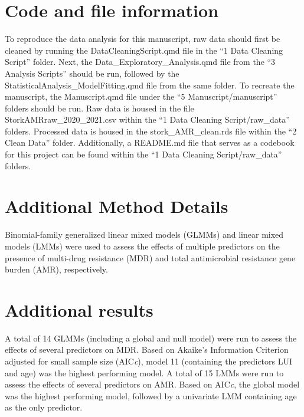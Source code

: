 \documentclass[
  letterpaper,
  DIV=11,
  numbers=noendperiod]{scrartcl}
\begin{document}
\hypertarget{code-and-file-information}{%
\section{Code and file information}\label{code-and-file-information}}

To reproduce the data analysis for this manuscript, raw data should
first be cleaned by running the DataCleaningScript.qmd file in the ``1
Data Cleaning Script'' folder. Next, the Data\_Exploratory\_Analysis.qmd
file from the ``3 Analysis Scripts'' should be run, followed by the
StatisticalAnalysis\_ModelFitting.qmd file from the same folder. To
recreate the manuscript, the Manuscript.qmd file under the ``5
Manuscript/manuscript'' folders should be run. Raw data is housed in the
file StorkAMRraw\_2020\_2021.csv within the ``1 Data Cleaning
Script/raw\_data'' folders. Processed data is housed in the
stork\_AMR\_clean.rds file within the ``2 Clean Data'' folder.
Additionally, a README.md file that serves as a codebook for this
project can be found within the ``1 Data Cleaning Script/raw\_data''
folders.

\newpage{}

\hypertarget{additional-method-details}{%
\section{Additional Method Details}\label{additional-method-details}}

Binomial-family generalized linear mixed models (GLMMs) and linear mixed
models (LMMs) were used to assess the effects of multiple predictors on
the presence of multi-drug resistance (MDR) and total antimicrobial
resistance gene burden (AMR), respectively.

\newpage{}

\hypertarget{additional-results}{%
\section{Additional results}\label{additional-results}}

A total of 14 GLMMs (including a global and null model) were run to
assess the effects of several predictors on MDR. Based on Akaike's
Information Criterion adjusted for small sample size (AIC\emph{c}),
model 11 (containing the predictors LUI and age) was the highest
performing model. A total of 15 LMMs were run to assess the effects of
several predictors on AMR. Based on AIC\emph{c}, the global model was
the highest performing model, followed by a univariate LMM containing
age as the only predictor.
\end{document}
